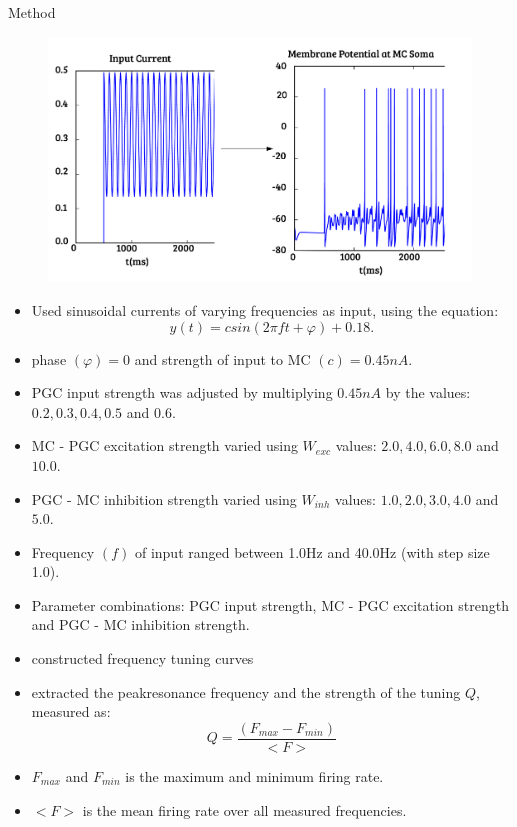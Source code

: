 \documentclass[final,hyperref={pdfpagelabels=false}]{beamer}
\begin{document}
\begin{frame}{}
\begin{columns}[t]
\begin{column}{.48\linewidth}
\begin{block}{Method}
 
\begin{figure}
\center
\includegraphics[scale=1.2]{images/Figure2}
\end{figure}
\begin{itemize}
\item Used sinusoidal currents of varying frequencies as input, using the equation:
\begin{equation}
y(t) = csin(2 \pi ft + \varphi) + 0.18. 
\end{equation}
\item phase $(\varphi) = 0$ and strength of input to MC $(c) = 0.45nA$.
\item PGC input strength was adjusted by multiplying $0.45nA$ by the values: $0.2, 0.3, 0.4, 0.5$ and $0.6$.
\item MC - PGC excitation strength varied using $W_{exc}$ values: $2.0, 4.0, 6.0, 8.0$ and $10.0$.
\item PGC - MC inhibition strength varied using $W_{inh}$ values: $1.0, 2.0, 3.0, 4.0$ and $5.0$.
\item Frequency $(f)$ of input ranged between 1.0Hz and 40.0Hz (with step size 1.0).
\item Parameter combinations: PGC input strength, MC - PGC excitation strength and PGC - MC inhibition strength.
\end{itemize}
      	
\begin{itemize}
\item constructed frequency tuning curves
\item extracted the peakresonance frequency and the strength of the tuning $Q$, measured as:
\begin{equation}
Q = \frac{(F_{max} - F_{min})}{<F>}
\end{equation}
\item $F_{max}$ and $F_{min}$ is the maximum and minimum firing rate.
\item $<F>$ is the mean firing rate over all measured frequencies.
\end{itemize}
      	

\end{block}
\end{column}
\end{columns}
\end{frame}
\end{document}
